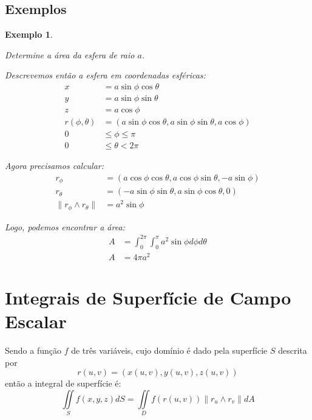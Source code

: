 \documentclass{article}
\newcommand{\doubleint}[2] {\iint\limits_{#1} #2}
\newcommand{\norm}[1] {\left.\parallel #1 \right.\parallel}
\newtheorem{example}{Exemplo}[section]
\begin{document}
        \subsection{Exemplos}
            \begin{example}
                \label{ex:area-esfera}

                Determine a área da esfera de raio $a$.

                Descrevemos então a esfera em coordenadas esféricas:
                \begin{align*}
                    x &= a \sin \phi \cos \theta\\
                    y &= a \sin \phi \sin \theta\\
                    z &= a \cos \phi\\
                    r(\phi, \theta) &= (a\sin\phi \cos\theta, a\sin\phi \sin\theta, a\cos\phi)\\
                    0 &\leq \phi \leq \pi\\
                    0 &\leq \theta < 2\pi
                \end{align*}

                Agora precisamos calcular:
                \begin{align*}
                    r_\phi &= (a\cos\phi \cos\theta, a\cos\phi \sin\theta, -a\sin\phi)\\
                    r_\theta &= (-a\sin\phi \sin\theta, a\sin\phi \cos\theta, 0)\\
                    \norm{r_\phi \wedge r_\theta} &= a^2 \sin\phi
                \end{align*}

                Logo, podemos encontrar a área:
                \begin{align*}
                    A &= \int_0^{2\pi} \int_0^\pi a^2 \sin\phi d\phi d\theta\\
                    A &= 4\pi a^2
                \end{align*}
            \end{example}


    \section{Integrais de Superfície de Campo Escalar}
        Sendo a função $f$ de três variáveis, cujo domínio é dado pela superfície $S$ descrita por
        \[
            r(u, v) = (x(u, v), y(u, v), z(u, v))
        \]
        então a integral de superfície é:
        \[
            \doubleint{S}{f(x,y,z) dS} = \doubleint{D}{f(r(u, v)) \norm{r_u \wedge r_v} dA}
        \]
\end{document}
